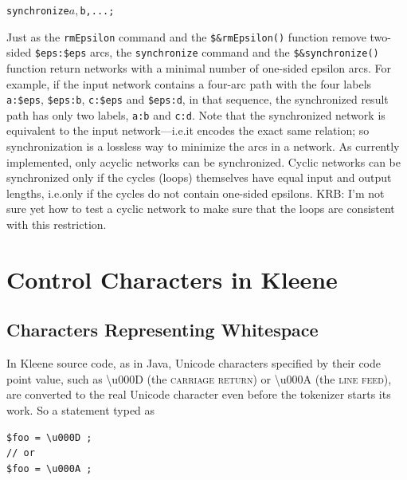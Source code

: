 \documentclass[letterpaper,12pt]{article}
\newcommand{\acro}{\textsc}
\begin{document}
\begin{samepage}
\begin{changebar}

\begin{alltt}
synchronize $a, $b, ... ;
\end{alltt}

Just as the \texttt{rmEpsilon} command and the \verb!$&rmEpsilon()!
function remove two-sided \verb!$eps:$eps! arcs, the \texttt{synchronize}
command and the \verb!$&synchronize()! function return networks with a
minimal number of one-sided epsilon arcs.  For example, if the input
network contains a four-arc path with the four labels \verb!a:$eps!,
\verb!$eps:b!, \verb!c:$eps! and \verb!$eps:d!, in that sequence, the
synchronized result path has only two labels, \verb!a:b! and \verb!c:d!.
Note that the synchronized network is equivalent to the input
network---i.e.\@ it encodes the exact same relation; so synchronization
is a lossless way to minimize the arcs in a network.  As currently
implemented, only acyclic networks can be synchronized. Cyclic
networks can be synchronized only if the cycles (loops) themselves have
equal input and output lengths, i.e.\@ only if the cycles do not contain
one-sided epsilons.  KRB:  I'm not sure yet how to test a cyclic network to
make sure that the loops are consistent with this restriction.

\end{changebar}
\end{samepage}

\newpage

\section{Control Characters in Kleene}

\label{app:controlcharacters}

\subsection{Characters Representing Whitespace}

In Kleene source code, as in Java, Unicode characters specified by their
code point value, such as \textbackslash{}u000D (the \acro{carriage
return}) or \textbackslash{}u000A (the \acro{line feed}), are converted
to the real Unicode character even before the tokenizer starts its work.
So a statement typed as

\begin{Verbatim}[fontsize=\small]
$foo = \u000D ;
// or
$foo = \u000A ;
\end{Verbatim}
\end{document}
